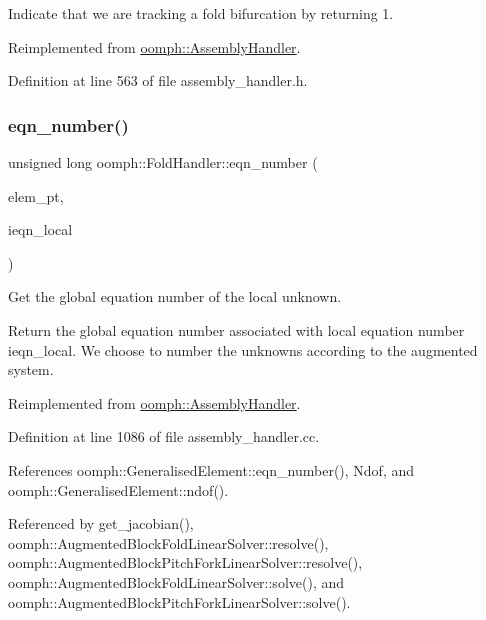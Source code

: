 Indicate that we are tracking a fold bifurcation by returning 1. 



Reimplemented from \hyperlink{classoomph_1_1AssemblyHandler_a22c5f240674e4f6cee12006790c11dae}{oomph\+::\+Assembly\+Handler}.



Definition at line 563 of file assembly\+\_\+handler.\+h.

\mbox{\label{classoomph_1_1FoldHandler_a30f2973860c13a183d5647a63b0c2ead}} 
\subsubsection{\texorpdfstring{eqn\+\_\+number()}{eqn\_number()}}
{\footnotesize\ttfamily unsigned long oomph\+::\+Fold\+Handler\+::eqn\+\_\+number (\begin{DoxyParamCaption}\item[{\hyperlink{classoomph_1_1GeneralisedElement}{Generalised\+Element} $\ast$const \&}]{elem\+\_\+pt,  }\item[{const unsigned \&}]{ieqn\+\_\+local }\end{DoxyParamCaption})\hspace{0.3cm}{\ttfamily [virtual]}}



Get the global equation number of the local unknown. 

Return the global equation number associated with local equation number ieqn\+\_\+local. We choose to number the unknowns according to the augmented system. 

Reimplemented from \hyperlink{classoomph_1_1AssemblyHandler_a94d28e2de2559cde803d1ba2195b5290}{oomph\+::\+Assembly\+Handler}.



Definition at line 1086 of file assembly\+\_\+handler.\+cc.



References oomph\+::\+Generalised\+Element\+::eqn\+\_\+number(), Ndof, and oomph\+::\+Generalised\+Element\+::ndof().



Referenced by get\+\_\+jacobian(), oomph\+::\+Augmented\+Block\+Fold\+Linear\+Solver\+::resolve(), oomph\+::\+Augmented\+Block\+Pitch\+Fork\+Linear\+Solver\+::resolve(), oomph\+::\+Augmented\+Block\+Fold\+Linear\+Solver\+::solve(), and oomph\+::\+Augmented\+Block\+Pitch\+Fork\+Linear\+Solver\+::solve().

